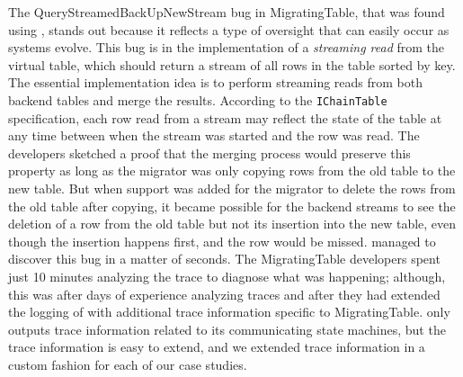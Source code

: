 The QueryStreamedBackUpNewStream bug in MigratingTable, that was found using \psharp, stands out because it reflects a type of oversight that can easily occur as systems evolve. This bug is in the implementation of a \emph{streaming read} from the virtual table, which should return a stream of all rows in the table sorted by key. The essential implementation idea is to perform streaming reads from both backend tables and merge the results. According to the \texttt{IChainTable} specification, each row read from a stream may reflect the state of the table at any time between when the stream was started and the row was read. The developers sketched a proof that the merging process would preserve this property as long as the migrator was only copying rows from the old table to the new table. But when support was added for the migrator to delete the rows from the old table after copying, it became possible for the backend streams to see the deletion of a row from the old table but not its insertion into the new table, even though the insertion happens first, and the row would be missed. \psharp managed to discover this bug in a matter of seconds. The MigratingTable developers spent just 10 minutes analyzing the trace to diagnose what was happening; although, this was after days of experience analyzing traces and after they had extended the logging of \psharp with additional trace information specific to MigratingTable. \psharp only outputs trace information related to its communicating state machines, but the trace information is easy to extend, and we extended trace information in a custom fashion for each of our case studies.


